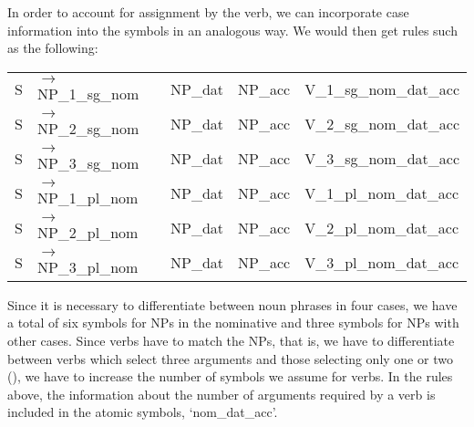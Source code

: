 In order to account for  assignment by the verb, we can incorporate case information into the symbols in an analogous way. We would then
get rules such as the following:
\ea
\label{ditrans-ps-regeln}
\begin{tabular}[t]{@{}l@{ }l@{~~}l@{~~}l@{~~}l}
S  & $\to$ NP\_1\_sg\_nom & NP\_dat & NP\_acc & V\_1\_sg\_nom\_dat\_acc\\
S  & $\to$ NP\_2\_sg\_nom & NP\_dat & NP\_acc & V\_2\_sg\_nom\_dat\_acc\\
S  & $\to$ NP\_3\_sg\_nom & NP\_dat & NP\_acc & V\_3\_sg\_nom\_dat\_acc\\
S  & $\to$ NP\_1\_pl\_nom & NP\_dat & NP\_acc & V\_1\_pl\_nom\_dat\_acc\\
S  & $\to$ NP\_2\_pl\_nom & NP\_dat & NP\_acc & V\_2\_pl\_nom\_dat\_acc\\
S  & $\to$ NP\_3\_pl\_nom & NP\_dat & NP\_acc & V\_3\_pl\_nom\_dat\_acc\\
\end{tabular}
\z
Since it is necessary to differentiate between noun phrases in four cases, we have a total of six symbols for NPs in the nominative and three symbols for NPs with
other cases. Since verbs have to match the NPs, that is, we have to differentiate between verbs which select three arguments and those selecting only one or two (),
we have to increase the number of symbols we assume for verbs.
\eal
{}
\zl
In the rules above, the information about the number of arguments required by a verb is included in
the atomic symbols, \eg `nom\_dat\_acc'.

